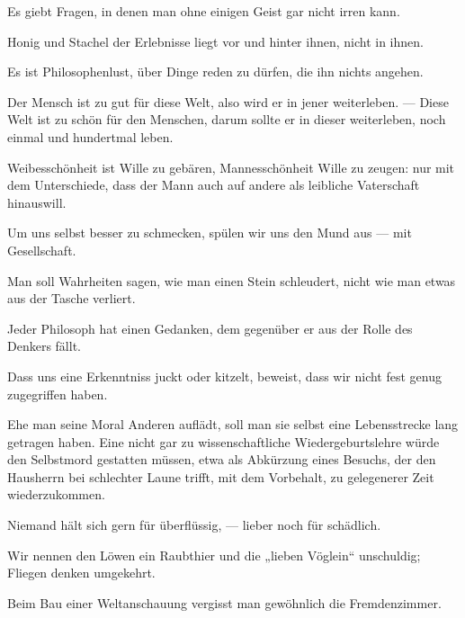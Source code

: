 Es giebt Fragen, in denen man ohne einigen Geist gar nicht irren kann.
\par

Honig und Stachel der Erlebnisse liegt vor und hinter ihnen, nicht in ihnen.
\par

Es ist Philosophenlust, über Dinge reden zu dürfen, die ihn nichts angehen.
\par

Der Mensch ist zu gut für diese Welt, also wird er in jener weiterleben. — Diese Welt ist zu schön für den Menschen, darum sollte er in dieser weiterleben, noch einmal und hundertmal leben.
\par

Weibesschönheit ist Wille zu gebären, Mannesschönheit Wille zu zeugen: nur mit dem Unterschiede, dass der Mann auch auf andere als leibliche Vaterschaft hinauswill.
\par

Um uns selbst besser zu schmecken, spülen wir uns den Mund aus — mit Gesellschaft.
\par

Man soll Wahrheiten sagen, wie man einen Stein schleudert, nicht wie man etwas aus der Tasche verliert.
\par

Jeder Philosoph hat einen Gedanken, dem gegenüber er aus der Rolle des Denkers fällt.
\par

Dass uns eine Erkenntniss juckt oder kitzelt, beweist, dass wir nicht fest genug zugegriffen haben.
\par

Ehe man seine Moral Anderen auflädt, soll man sie selbst eine Lebensstrecke lang getragen haben. Eine nicht gar zu wissenschaftliche Wiedergeburtslehre würde den Selbstmord gestatten müssen, etwa als Abkürzung eines Besuchs, der den Hausherrn bei schlechter Laune trifft, mit dem Vorbehalt, zu gelegenerer Zeit wiederzukommen.
\par

Niemand hält sich gern für überflüssig, — lieber noch für schädlich.
\par

Wir nennen den Löwen ein Raubthier und die „lieben Vöglein“ unschuldig; Fliegen denken umgekehrt.
\par

Beim Bau einer Weltanschauung vergisst man gewöhnlich die Fremdenzimmer.
\par

